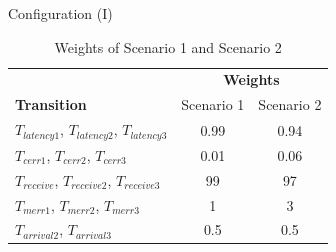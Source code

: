 \documentclass[xcolor=svgnames]{beamer}
\newcommand {\otoprule}{\midrule [\heavyrulewidth]}  %
\begin{document}
  \begin{frame}{ Configuration (I)}
        \begin{table}[!h]
            \centering
            \caption{Weights of Scenario 1 and Scenario 2}
            \label{table:transitionsConfigurations}
            \begin{tabular}{ lcc}
	      \toprule	
        		    &   \multicolumn{2}{c}{ \textbf{Weights} } \\
	      \cmidrule(r){2-3}
              \textbf{Transition}      		&      Scenario 1   &   Scenario 2 		\\
	      \otoprule
               $T_{latency1}$, $T_{latency2}$, $T_{latency3}$ 	& 	0.99       &   0.94	\\
               $T_{cerr1}$, $T_{cerr2}$, $T_{cerr3}$      	&  	0.01 	   &   0.06	\\
               $T_{receive}$, $T_{receive2}$, $T_{receive3}$  &  	99  	   &    97	\\
               $T_{merr1}$, $T_{merr2}$, $T_{merr3}$   &   1 	   &    3	\\
               $T_{arrival2}$, $T_{arrival3}$   &  0.5  &	0.5	\\
              \bottomrule
            \end{tabular}
        \end{table}

  \end{frame}
\end{document}

